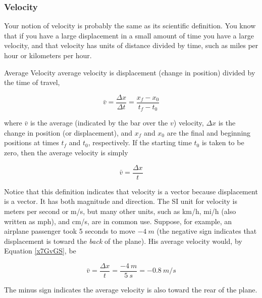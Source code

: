 \documentclass[../../main-ap-physics.tex]{subfiles}
\begin{document}
\subsubsection*{Velocity}

Your notion of velocity is probably the same as its scientific definition. You know that if you have a large displacement in a small amount of time you have a large velocity, and that velocity has units of distance divided by time, such as miles per hour or kilometers per hour.

\begin{gradient}{Average Velocity}
    \Gls{average velocity} is displacement (change in position) divided by the time of travel,

    \begin{equation} \label{yHaY2u}
        \bar{v} = \frac{\Delta x}{\Delta t} = \frac{x_f - x_0}{t_f - t_0}
    \end{equation}

    where $\bar{v}$ is the average (indicated by the bar over the $v$) velocity, $\Delta x$ is the change in position (or displacement), and $x_f$ and $x_0$ are the final and beginning positions at times $t_f$ and $t_0$, respectively. If the starting time $t_0$ is taken to be zero, then the average velocity is simply

    \begin{equation} \label{x7GvGS}
        \bar{v} = \frac{\Delta x}{t}
    \end{equation}
\end{gradient}

Notice that this definition indicates that velocity is a vector because displacement is a vector. It has both magnitude and direction. The SI unit for velocity is meters per second or m/s, but many other units, such as km/h, mi/h (also written as mph), and cm/s, are in common use. Suppose, for example, an airplane passenger took 5 seconds to move $-\SI{4}{m}$ (the negative sign indicates that displacement is toward the \textit{back} of the plane). His average velocity would, by Equation \eqref{x7GvGS}, be

\begin{equation*}
    \bar{v} = \frac{\Delta x}{t} = \frac{-\SI{4}{m}}{\SI{5}{s}} = -\SI{0.8}{m/s}
\end{equation*}

The minus sign indicates the average velocity is also toward the rear of the plane.

\vspace{1em}
\end{document}
